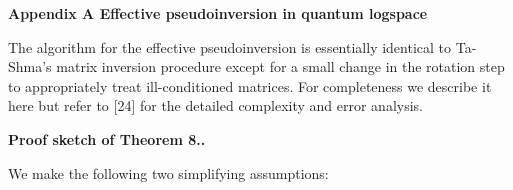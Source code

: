 \par\medskip\noindent\textbf{
Appendix A Effective pseudoinversion in quantum logspace}\par




The algorithm for the effective pseudoinversion is essentially identical to Ta-Shma’s matrix inversion procedure except for a small change in the rotation step to appropriately treat ill-conditioned matrices.
For completeness we describe it here but refer to [24] for the detailed complexity and error analysis.\par




\par\medskip\noindent\textbf{Proof sketch of Theorem 8..}\par




We make the following two simplifying assumptions:\par


